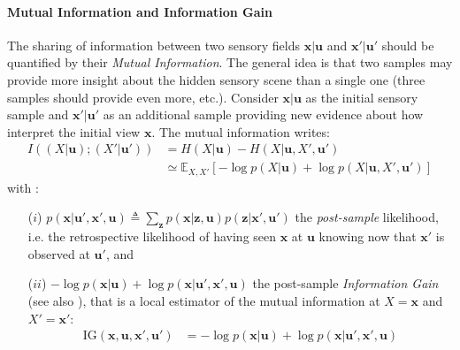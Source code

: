 \documentclass[12pt,twoside,openright]{article}
\begin{document}
\paragraph{Mutual Information and Information Gain}
The sharing of information between two sensory fields $\boldsymbol{x}|\boldsymbol{u}$ and $\boldsymbol{x}'|\boldsymbol{u}'$  should be quantified by their \emph{Mutual Information}. The general idea is that two samples may provide more insight about the hidden sensory scene than a single one (three samples should provide even more, etc.). 
{\color{Purple} Consider $\boldsymbol{x}|\boldsymbol{u}$ as the initial sensory sample and $\boldsymbol{x}'|\boldsymbol{u}'$ as an additional sample providing new evidence about how interpret the initial view $\boldsymbol{x}$}.
The mutual information writes:
\begin{align}
I((X| \boldsymbol{u}); (X'| \boldsymbol{u}')) &= H(X| \boldsymbol{u}) - H(X| \boldsymbol{u}, X', \boldsymbol{u}')\label{eq:mutual-info}\\
&\simeq \mathbb{E}_{X,X'} \left[-\log p(X| \boldsymbol{u}) + \log p(X| \boldsymbol{u}, X', \boldsymbol{u}')\right] 
\end{align}
with :
\begin{itemize}
	\item[($i$)] $ p(\boldsymbol{x}| \boldsymbol{u}', \boldsymbol{x}', \boldsymbol{u}) \triangleq \sum_{\boldsymbol{z}} p(\boldsymbol{x}|\boldsymbol{z}, \boldsymbol{u}) p(\boldsymbol{z}|\boldsymbol{x}', \boldsymbol{u}')$ 
	the \emph{post-sample} likelihood, i.e. the retrospective likelihood of having seen $\boldsymbol{x}$ at $\boldsymbol{u}$ knowing now that $\boldsymbol{x}'$ is observed at $\boldsymbol{u}'$, and
	\item[($ii$)] 
	$-\log p(\boldsymbol{x}| \boldsymbol{u}) + \log p(\boldsymbol{x}| \boldsymbol{u}', \boldsymbol{x}', \boldsymbol{u})$ the post-sample
	\emph{Information Gain} (see also \citet{tishby2011information}), that is a local estimator of the mutual information at $X = \boldsymbol{x}$ and $X' = \boldsymbol{x}'$:
	\begin{align}
	\text{IG}(\boldsymbol{x},\boldsymbol{u}, \boldsymbol{x}', \boldsymbol{u}') 
	&= -\log p(\boldsymbol{x}| \boldsymbol{u}) + \log p(\boldsymbol{x}| \boldsymbol{u}', \boldsymbol{x}', \boldsymbol{u}) \label{eq:info-gain}
	\end{align}
\end{itemize}
 
\end{document}
